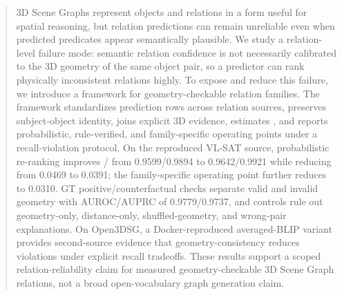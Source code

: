 \begin{abstract}
3D Scene Graphs represent objects and relations in a form useful for spatial
reasoning, but relation predictions can remain unreliable even when predicted
predicates appear semantically plausible. We study a relation-level failure
mode: semantic relation confidence is not necessarily calibrated to the 3D
geometry of the same object pair, so a predictor can rank physically
inconsistent relations highly. To expose and reduce this failure, we introduce
a \method{} framework for geometry-checkable relation families. The framework
standardizes prediction rows across relation sources, preserves subject-object
identity, joins explicit 3D evidence, estimates \pgeom{}, and reports
probabilistic, rule-verified, and family-specific operating points under a
recall-violation protocol. On the reproduced VL-SAT source, probabilistic
re-ranking improves / from 0.9599/0.9894 to 0.9642/0.9921
while reducing  from 0.0469 to 0.0391; the family-specific operating
point further reduces  to 0.0310. GT positive/counterfactual checks
separate valid and invalid geometry with AUROC/AUPRC of 0.9779/0.9737, and
controls rule out geometry-only, distance-only, shuffled-geometry, and
wrong-pair explanations. On Open3DSG, a Docker-reproduced averaged-BLIP variant
provides second-source evidence that geometry-consistency reduces violations
under explicit recall tradeoffs. These results support a scoped
relation-reliability claim for measured geometry-checkable 3D Scene Graph
relations, not a broad open-vocabulary graph generation claim.
\end{abstract}

